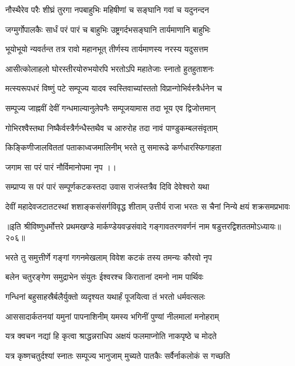 \twolineshloka
{नौस्थैरेव परैः शीघ्रं तुरगा नपबाहुभिः}
{महिषीणां च सङ्घानि गवां च यदुनन्दन} %

\twolineshloka
{जग्मुर्गोपालकैः सार्धं परं पारं च बाहुभिः}
{उष्ट्रगर्दभसङ्घानि तार्यमाणानि बाहुभिः}%

\twolineshloka
{भूयोभूयो न्यवर्तन्त तत्र रावो महानभूत्}
{तीर्णस्य तार्यमाणस्य नरस्य यदुसत्तम}%

\twolineshloka
{आसीत्कोलाहलो घोरस्तीरयोरुभयोरपि}
{भरतोऽपि महातेजाः स्नातो हुतहुताशनः}%

\twolineshloka
{मत्स्यरूपधरं विष्णुं पटे सम्पूज्य यादव}
{स्वस्तिवाच्यांस्ततो विप्रान्गोभिर्वस्त्रैर्धनेन च}%

\twolineshloka
{सम्पूज्य जाह्नवीं देवीं गन्धमाल्यानुलेपनैः}
{सम्पूजयामास तदा भूय एव द्विजोत्तमान्}%

\twolineshloka
{गोभिरश्वैस्तथा निष्कैर्वस्त्रैर्गन्धैस्तथैव च}
{आरुरोह तदा नावं पाण्डुकम्बलसंवृताम्}%

\twolineshloka
{किङ्किणीजालविततां पताकाध्वजमालिनीम्}
{भरते तु समारूढे कर्णधारस्फिगाहता}%

जगाम सा परं पारं नौर्विमानोपमा नृप ।।

\twolineshloka
{सम्प्राप्य स परं पारं सम्पूर्णकटकस्तदा}
{उवास राजंस्तत्रैव दिवि देवेश्वरो यथा}%

\twolineshloka
{देवीं महादेवजटातटस्थां शशाङ्कसंसर्गविवृद्ध शीताम्}
{उत्तीर्य राजा भरतः स चैनां निन्ये क्षयं शक्रसमप्रभावः}%

॥इति श्रीविष्णुधर्मोत्तरे प्रथमखण्डे मार्कण्डेयवज्रसंवादे गङ्गावतरणवर्णनं नाम षडुत्तरद्विशततमोऽध्यायः॥२०६॥



\twolineshloka
{भरते तु समुत्तीर्णे गङ्गां गगनमेखलाम्}
{विवेश कटकं तस्य तमन्यः कौरवो नृप}%

\twolineshloka
{बलेन चतुरङ्गेण समुद्राभेन संयुतः}
{ईश्वरश्च किरातानां दमनो नाम पार्थिवः}%

\twolineshloka
{गन्धिनां बहुसाहस्रैर्बलैर्युक्तो व्यदृश्यत}
{यथार्हं पूजयित्वा तं भरतो धर्मवत्सलः}%

\twolineshloka
{आससादार्कतनयां यमुनां पापनाशिनीम्}
{यमस्य भगिनीं पुण्यां नीलमालां मनोहराम्}%

\twolineshloka
{यत्र क्वचन नद्यां हि कृत्वा श्राद्धन्नराधिप}
{अक्षयं फलमाप्नोति नाकपृष्ठे च मोदते}%

\twolineshloka
{यत्र कृष्णचतुर्दश्यां स्नातः सम्पूज्य भानुजाम्}
{मुच्यते पातकैः सर्वैर्नाकलोकं स गच्छति}%

